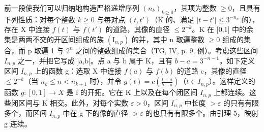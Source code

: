 前一段使我们可以归纳地构造严格递增序列 \((n_{k})_{k\geqslant0}\)，其项为整数 \(\geqslant0\)，且具有下列性质：对每个整数 \(k\geqslant0\) 与每对点 \((t,t')\)（K 的、满足 \(|t-t'| \leqslant3^{-n_{k}}\) 的），存在 X 中连接 \(f(t)\) 与 \(f(t')\) 的道路，其像的直径 \(\leqslant2^{-k}\)。K 在 {[}0,1{]} 中的余集是两两不交的开区间组成的族 \((\mathrm{I}_{n,p})\) 的并，其中 n 取遍整数 \(\geqslant0\) 组成的集合，而 p 取遍 1 与 \(2^{n}\) 之间的整数组成的集合（TG, IV, p. 9, 例）。考虑这些区间 \(I_{n,p}\) 之一，并把它写成 {]}a,b{[}。点 a 与 b 属于 K，且有 \(b-a=3^{-n-1}\)。如下定义区间 \(I_{n,p}\) 上的函数 g：选取 X 中连接 \(f(a)\) 与 \(f(b)\) 的道路 c，其像的直径 \(\leqslant2^{-k}\)（当 \(n_{k}\leqslant n<n_{k+1}\) 时），并令 \(g(t)=c(\frac{t-a}{b-a})\)（\(t\in I_{n,p}\)）。这样定义的函数 \(g\colon[0,1]\to X\) 是 f 的开拓。它在 K 上以及在每个闭区间 \(\overline{I_{n,p}}\) 上都连续。这些闭区间与 K 相交。此外，对每个实数 \(\varepsilon>0\)，区间 \(\overline{I_{n,p}}\) 中长度 \(>\varepsilon\) 的只有有限多个，而区间 \(\overline{I_{n,p}}\) 中在 g 下的像的直径 \(>\varepsilon\) 的也只有有限多个。由引理 5，映射 g 连续。
\relax{}
